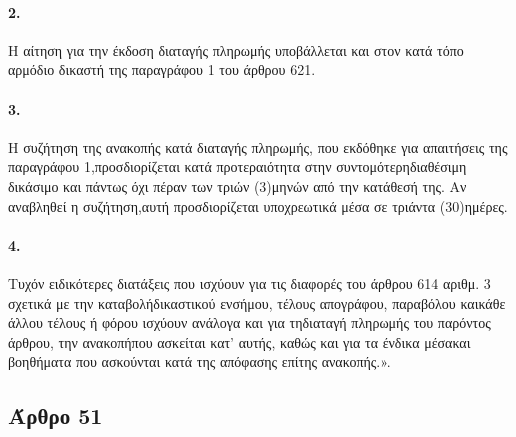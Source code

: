 \documentclass[a4paper,oneside, 10pt]{book}
\begin{document}
\paragraph { 2. } Η αίτηση για την έκδοση διαταγής πληρωμής υποβάλλεται και στον κατά τόπο αρμόδιο δικαστή της παραγράφου 1 του άρθρου 621.
\paragraph { 3. } Η συζήτηση της ανακοπής κατά διαταγής πληρωμής, που εκδόθηκε για απαιτήσεις της παραγράφου 1,προσδιορίζεται κατά προτεραιότητα στην συντομότερηδιαθέσιμη δικάσιμο και πάντως όχι πέραν των τριών (3)μηνών από την κατάθεσή της. Αν αναβληθεί η συζήτηση,αυτή προσδιορίζεται υποχρεωτικά μέσα σε τριάντα (30)ημέρες.
\paragraph { 4. } Τυχόν ειδικότερες διατάξεις που ισχύουν για τις διαφορές του άρθρου 614 αριθμ. 3 σχετικά με την καταβολήδικαστικού ενσήμου, τέλους απογράφου, παραβόλου καικάθε άλλου τέλους ή φόρου ισχύουν ανάλογα και για τηδιαταγή πληρωμής του παρόντος άρθρου, την ανακοπήπου ασκείται κατ’ αυτής, καθώς και για τα ένδικα μέσακαι βοηθήματα που ασκούνται κατά της απόφασης επίτης ανακοπής.».
\subsection*{ Άρθρο 51 }
\end{document}
